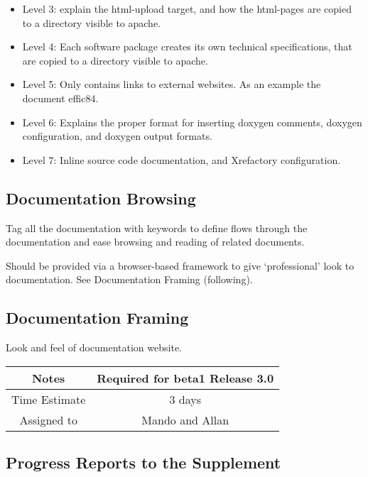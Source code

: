 \documentclass[12pt]{article}
\begin{document}
\begin{itemize}
\item Level 3: explain the html-upload target, and how the html-pages
  are copied to a directory visible to apache.
\item Level 4: Each software package creates its own technical
  specifications, that are copied to a directory visible to apache.
\item Level 5: Only contains links to external websites.  As an
  example the document effic84.
\item Level 6: Explains the proper format for inserting doxygen comments,
 doxygen configuration, and doxygen output formats.
\item Level 7: Inline source code documentation, and Xrefactory configuration. 
\end{itemize}

\subsection{Documentation Browsing}

Tag all the documentation with keywords to define flows through the
documentation and ease browsing and reading of related documents.

Should be provided via a browser-based framework to give
`professional' look to documentation. See Documentation Framing
(following).


\subsection{Documentation Framing}

Look and feel of documentation website.

{
  \vspace{5mm}
  \centering
  \begin{tabular}{|c|c|}
    \hline
    Notes
    & Required for beta1 Release 3.0 \\
    \hline
    Time Estimate
    & 3 days \\
    \hline
    Assigned to
    & Mando and Allan \\
    \hline
  \end{tabular}
}



\subsection{Progress Reports to the Supplement}
\end{document}
